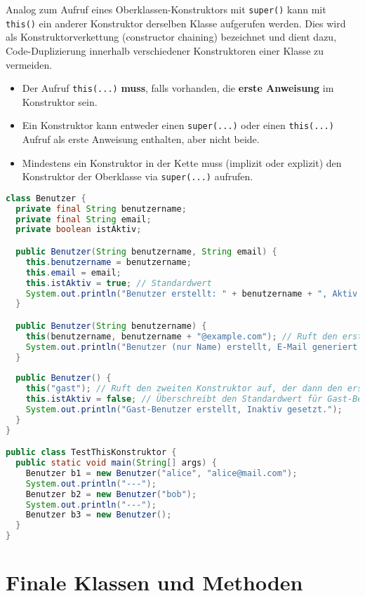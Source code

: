 Analog zum Aufruf eines Oberklassen-Konstruktors mit \texttt{super()} kann mit \texttt{this()} ein anderer Konstruktor derselben 
Klasse aufgerufen werden. Dies wird als Konstruktorverkettung (constructor chaining) bezeichnet und dient dazu, Code-Duplizierung 
innerhalb verschiedener Konstruktoren einer Klasse zu vermeiden.
\begin{itemize}
    \item Der Aufruf \texttt{this(...)} \textbf{muss}, falls vorhanden, die \textbf{erste Anweisung} im Konstruktor sein.
    \item Ein Konstruktor kann entweder einen \texttt{super(...)} oder einen \texttt{this(...)} Aufruf als erste Anweisung enthalten, aber nicht beide.
    \item Mindestens ein Konstruktor in der Kette muss (implizit oder explizit) den Konstruktor der Oberklasse via \texttt{super(...)} aufrufen.
\end{itemize}

\begin{lstlisting}[language=Java, caption={Aufruf eines anderen Konstruktors derselben Klasse via \texttt{this()}}]
class Benutzer {
  private final String benutzername;
  private final String email;
  private boolean istAktiv;

  public Benutzer(String benutzername, String email) {
    this.benutzername = benutzername;
    this.email = email;
    this.istAktiv = true; // Standardwert
    System.out.println("Benutzer erstellt: " + benutzername + ", Aktiv: " + istAktiv);
  }

  public Benutzer(String benutzername) {
    this(benutzername, benutzername + "@example.com"); // Ruft den ersten Konstruktor auf
    System.out.println("Benutzer (nur Name) erstellt, E-Mail generiert.");
  }
    
  public Benutzer() {
    this("gast"); // Ruft den zweiten Konstruktor auf, der dann den ersten aufruft
    this.istAktiv = false; // Überschreibt den Standardwert für Gast-Benutzer
    System.out.println("Gast-Benutzer erstellt, Inaktiv gesetzt.");
  }
}

public class TestThisKonstruktor {
  public static void main(String[] args) {
    Benutzer b1 = new Benutzer("alice", "alice@mail.com");
    System.out.println("---");
    Benutzer b2 = new Benutzer("bob");
    System.out.println("---");
    Benutzer b3 = new Benutzer();
  }
}
\end{lstlisting}

\section{Finale Klassen und Methoden}
\label{sec:final}

